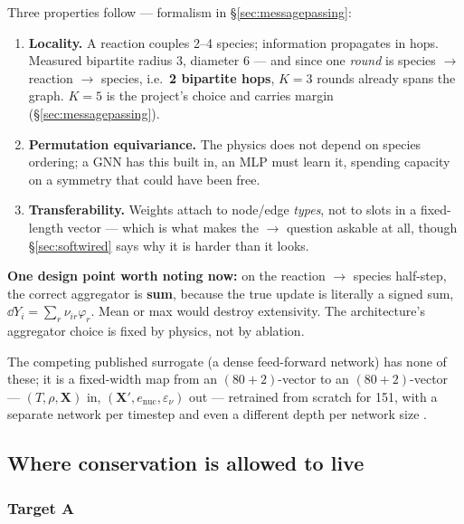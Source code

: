 Three properties follow --- formalism in \S\ref{sec:messagepassing}:

\begin{enumerate}
\item \textbf{Locality.} A reaction couples 2--4 species; information propagates
      in hops. Measured bipartite radius 3, diameter 6 --- and since one
      \emph{round} is species $\to$ reaction $\to$ species, i.e.\ \textbf{2
      bipartite hops}, $K = 3$ rounds already spans the graph. $K = 5$ is the
      project's choice and carries margin (\S\ref{sec:messagepassing}).
\item \textbf{Permutation equivariance.} The physics does not depend on species
      ordering; a GNN has this built in, an MLP must learn it, spending capacity
      on a symmetry that could have been free.
\item \textbf{Transferability.} Weights attach to node/edge \emph{types}, not to
      slots in a fixed-length vector --- which is what makes the
       $\to$  question askable at all, though
      \S\ref{sec:softwired} says why it is harder than it looks.
\end{enumerate}

\textbf{One design point worth noting now:} on the reaction $\to$ species
half-step, the correct aggregator is \textbf{sum}, because the true update is
literally a signed sum, $\dd Y_i = \sum_r \nu_{ir} \varphi_r$. Mean or max would
destroy extensivity. The architecture's aggregator choice is fixed by physics,
not by ablation.

The competing published surrogate (a dense feed-forward network) has none of
these; it is a fixed-width map from an $(80+2)$-vector to an $(80+2)$-vector ---
$(T, \rho, \mathbf{X})$ in, $(\mathbf{X}', e_{\text{nuc}}, \varepsilon_\nu)$ out
--- retrained from scratch for 151, with a separate network per timestep and
even a different depth per network size \citep{grichener2025}.

\subsection{Where conservation is allowed to live}
\label{sec:whereconservation}

\subsubsection{Target A}
\label{sec:targetA}

